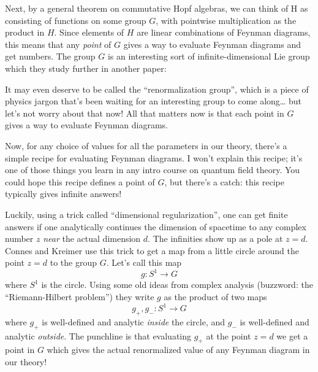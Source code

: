 \documentclass{article}
\def\tightlist{}
\renewcommand{\texttt}[1]{%
  \begingroup
  \ttfamily
  \begingroup\lccode`~=`/\lowercase{\endgroup\def~}{/\discretionary{}{}{}}%
  \begingroup\lccode`~=`[\lowercase{\endgroup\def~}{[\discretionary{}{}{}}%
  \begingroup\lccode`~=`.\lowercase{\endgroup\def~}{.\discretionary{}{}{}}%
  \catcode`/=\active\catcode`[=\active\catcode`.=\active
  \scantokens{#1\noexpand}%
  \endgroup
}
\begin{document}
Next, by a general theorem on commutative Hopf algebras, we can think of
H as consisting of functions on some group \(G\), with pointwise
multiplication as the product in \(H\). Since elements of \(H\) are
linear combinations of Feynman diagrams, this means that any
\emph{point} of \(G\) gives a way to evaluate Feynman diagrams and get
numbers. The group \(G\) is an interesting sort of infinite-dimensional
Lie group which they study further in another paper:


It may even deserve to be called the ``renormalization group'', which is
a piece of physics jargon that's been waiting for an interesting group
to come along\ldots{} but let's not worry about that now! All that
matters now is that each point in \(G\) gives a way to evaluate Feynman
diagrams.

Now, for any choice of values for all the parameters in our theory,
there's a simple recipe for evaluating Feynman diagrams. I won't explain
this recipe; it's one of those things you learn in any intro course on
quantum field theory. You could hope this recipe defines a point of
\(G\), but there's a catch: this recipe typically gives infinite
answers!

Luckily, using a trick called ``dimensional regularization'', one can
get finite answers if one analytically continues the dimension of
spacetime to any complex number \(z\) \emph{near} the actual dimension
\(d\). The infinities show up as a pole at \(z = d\). Connes and Kreimer
use this trick to get a map from a little circle around the point
\(z = d\) to the group \(G\). Let's call this map \[g\colon S^1 \to G\]
where \(S^1\) is the circle. Using some old ideas from complex analysis
(buzzword: the ``Riemann-Hilbert problem'') they write \(g\) as the
product of two maps \[g_+, g_-\colon S^1 \to G\] where \(g_+\) is
well-defined and analytic \emph{inside} the circle, and \(g_-\) is
well-defined and analytic \emph{outside}. The punchline is that
evaluating \(g_+\) at the point \(z = d\) we get a point in \(G\) which
gives the actual renormalized value of any Feynman diagram in our
theory!
\end{document}
